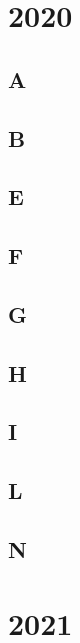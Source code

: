 \section{2020}
\subsection{A}
\raggedbottom
\hrulefill
\subsection{B}
\raggedbottom
\hrulefill
\subsection{E}
\raggedbottom
\hrulefill
\subsection{F}
\raggedbottom
\hrulefill
\subsection{G}
\raggedbottom
\hrulefill
\subsection{H}
\raggedbottom
\hrulefill
\subsection{I}
\raggedbottom
\hrulefill
\subsection{L}
\raggedbottom
\hrulefill
\subsection{N}
\raggedbottom
\hrulefill

\section{2021}
